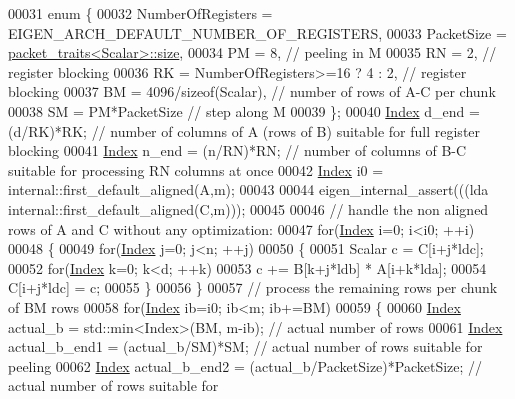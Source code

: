 \begin{DoxyCode}
00031   \textcolor{keyword}{enum} \{
00032     NumberOfRegisters = EIGEN\_ARCH\_DEFAULT\_NUMBER\_OF\_REGISTERS,
00033     PacketSize = \hyperlink{struct_eigen_1_1internal_1_1packet__traits}{packet\_traits<Scalar>::size},
00034     PM = 8,                             \textcolor{comment}{// peeling in M}
00035     RN = 2,                             \textcolor{comment}{// register blocking}
00036     RK = NumberOfRegisters>=16 ? 4 : 2, \textcolor{comment}{// register blocking}
00037     BM = 4096/\textcolor{keyword}{sizeof}(Scalar),           \textcolor{comment}{// number of rows of A-C per chunk}
00038     SM = PM*PacketSize                  \textcolor{comment}{// step along M}
00039   \};
00040   \hyperlink{namespace_eigen_a62e77e0933482dafde8fe197d9a2cfde}{Index} d\_end = (d/RK)*RK;    \textcolor{comment}{// number of columns of A (rows of B) suitable for full register
       blocking}
00041   \hyperlink{namespace_eigen_a62e77e0933482dafde8fe197d9a2cfde}{Index} n\_end = (n/RN)*RN;    \textcolor{comment}{// number of columns of B-C suitable for processing RN columns at once}
00042   \hyperlink{namespace_eigen_a62e77e0933482dafde8fe197d9a2cfde}{Index} i0 = internal::first\_default\_aligned(A,m);
00043   
00044   eigen\_internal\_assert(((lda%
      internal::first\_default\_aligned(C,m)));
00045   
00046   \textcolor{comment}{// handle the non aligned rows of A and C without any optimization:}
00047   \textcolor{keywordflow}{for}(\hyperlink{namespace_eigen_a62e77e0933482dafde8fe197d9a2cfde}{Index} i=0; i<i0; ++i)
00048   \{
00049     \textcolor{keywordflow}{for}(\hyperlink{namespace_eigen_a62e77e0933482dafde8fe197d9a2cfde}{Index} j=0; j<n; ++j)
00050     \{
00051       Scalar c = C[i+j*ldc];
00052       \textcolor{keywordflow}{for}(\hyperlink{namespace_eigen_a62e77e0933482dafde8fe197d9a2cfde}{Index} k=0; k<d; ++k)
00053         c += B[k+j*ldb] * A[i+k*lda];
00054       C[i+j*ldc] = c;
00055     \}
00056   \}
00057   \textcolor{comment}{// process the remaining rows per chunk of BM rows}
00058   \textcolor{keywordflow}{for}(\hyperlink{namespace_eigen_a62e77e0933482dafde8fe197d9a2cfde}{Index} ib=i0; ib<m; ib+=BM)
00059   \{
00060     \hyperlink{namespace_eigen_a62e77e0933482dafde8fe197d9a2cfde}{Index} actual\_b = std::min<Index>(BM, m-ib);                 \textcolor{comment}{// actual number of rows}
00061     \hyperlink{namespace_eigen_a62e77e0933482dafde8fe197d9a2cfde}{Index} actual\_b\_end1 = (actual\_b/SM)*SM;                   \textcolor{comment}{// actual number of rows suitable for
       peeling}
00062     \hyperlink{namespace_eigen_a62e77e0933482dafde8fe197d9a2cfde}{Index} actual\_b\_end2 = (actual\_b/PacketSize)*PacketSize;   \textcolor{comment}{// actual number of rows suitable for
}
\end{DoxyCode}
